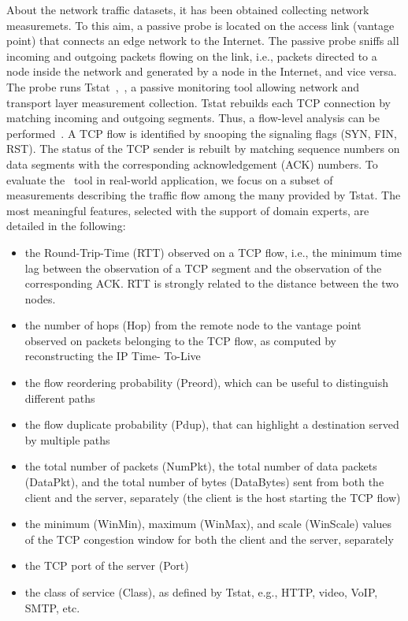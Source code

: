 About the network traffic datasets, it has been obtained collecting network measuremets.
To this aim, a passive probe is
located on the access link (vantage point) that connects an
edge network to the Internet. The passive probe sniffs all
incoming and outgoing packets flowing on the link, i.e.,
packets directed to a node inside the network and generated
by a node in the Internet, and vice versa. The probe runs
Tstat~\cite{Tstat},~\cite{Tstat2}, a passive monitoring tool allowing network
and transport layer measurement collection. Tstat rebuilds
each TCP connection by matching incoming and outgoing
segments. Thus, a flow-level analysis can be performed~\cite{Tstat2}.
A TCP flow is identified by snooping the signaling flags
(SYN, FIN, RST). The status of the TCP sender is rebuilt
by matching sequence numbers on data segments with the
corresponding acknowledgement (ACK) numbers.
To evaluate the \SeTAB\ tool in real-world application, we focus on a subset of measurements describing the traffic flow among the many provided by Tstat. The most meaningful features, selected with the
support of domain experts, are detailed in the following:
\begin{itemize}
\item the Round-Trip-Time (RTT) observed on a TCP flow,
i.e., the minimum time lag between the observation of a
TCP segment and the observation of the corresponding
ACK. RTT is strongly related to the distance between
the two nodes.
\item the number of hops (Hop) from the remote node to
the vantage point observed on packets belonging to the
TCP flow, as computed by reconstructing the IP Time-
To-Live
\item the flow reordering probability (P{reord}), which can
be useful to distinguish different paths
\item the flow duplicate probability (P{dup}), that can highlight
a destination served by multiple paths
\item the total number of packets (NumPkt), the total number
of data packets (DataPkt), and the total number
of bytes (DataBytes) sent from both the client and
the server, separately (the client is the host starting the
TCP flow)
\item the minimum (WinMin), maximum (WinMax), and
scale (WinScale) values of the TCP congestion window
for both the client and the server, separately
\item the TCP port of the server (Port)
\item the class of service (Class), as defined by Tstat, e.g.,
HTTP, video, VoIP, SMTP, etc.
\end{itemize}

